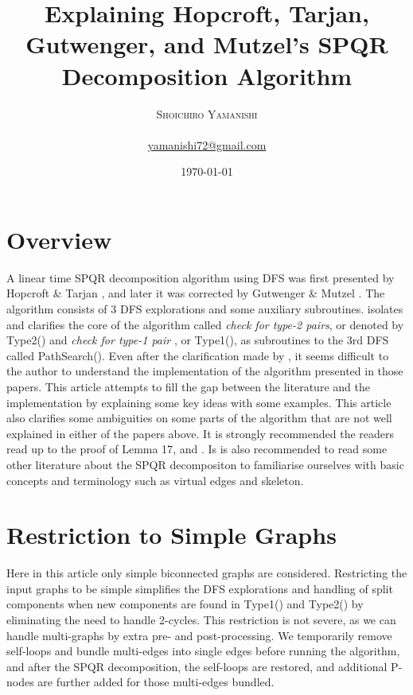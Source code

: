 \documentclass[twoside,twocolumn]{article}
\title{Explaining Hopcroft, Tarjan, Gutwenger, and Mutzel's SPQR Decomposition Algorithm} %
\author{%
\textsc{Shoichiro Yamanishi}\\[1ex] %
\normalsize \\ %
\normalsize \href{mailto:yamanishi72@gmail.com}{yamanishi72@gmail.com} %
}
\date{\today} %
\begin{document}
\maketitle


\section{Overview}
A linear time SPQR decomposition algorithm using DFS was first presented
by Hopcroft \& Tarjan \cite{HT73}, and later it was corrected by Gutwenger \& Mutzel
\cite{GM01}.
The algorithm consists of 3 DFS explorations and some auxiliary subroutines.
\cite{GM01} isolates and clarifies the core of the algorithm called
{\it check for type-2 pairs}, or denoted by {\ttfamily Type2()} and {\it check for type-1 pair }, or
{\ttfamily Type1()},  as subroutines to the 3rd DFS called {\ttfamily PathSearch()}.
Even after the clarification made by \cite{GM01}, it seems difficult to the author
to understand the implementation of the algorithm presented in those papers.
This article attempts to fill the gap between the literature and
the implementation by explaining some key ideas with some examples.
This article also clarifies some ambiguities on some parts of the algorithm
that are not well explained in either of the papers above.
It is strongly recommended the readers read \cite{HT73} up to the proof of {\ttfamily Lemma 17},
 and \cite{GM01}.
Is is also recommended to read some other literature about the SPQR
 decompositon to familiarise ourselves with basic concepts and terminology
 such as virtual edges and skeleton.



\section{Restriction to Simple Graphs}

Here in this article only simple biconnected graphs are considered.
Restricting the input graphs to be simple simplifies the DFS explorations
and handling of split components when new components are found in
{\ttfamily Type1()} and {\ttfamily Type2()} by eliminating the need to handle 2-cycles.
This restriction is not severe, as we can handle multi-graphs by extra
pre- and post-processing. We temporarily remove self-loops and bundle
multi-edges into single edges before running the algorithm, and after the
 SPQR decomposition, the self-loops are restored, and additional P-nodes are
further added for those multi-edges bundled.
\end{document}
